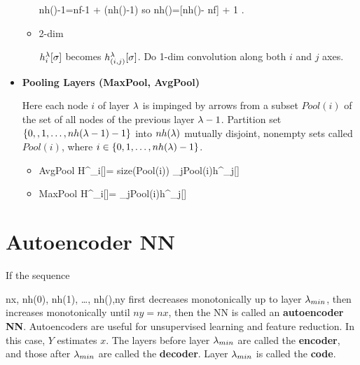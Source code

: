 \begin{itemize}
\begin{itemize}
\beq
nh()-1=nf-1 +
(nh(\lam)-1)\sigma
\;
\eeq
so
\beq
nh(\lam)=[nh()-
nf] + 1
\;.
\eeq
\item 2-dim

$h_i^\lambda[\sigma]$ becomes
$h_{(i,j)}^\lambda[\sigma]$.
Do 1-dim convolution
along both $i$ and $j$ axes.

\end{itemize}
\item{\bf Pooling Layers 
(MaxPool, AvgPool)}

Here each node $i$ 
of layer $\lambda$ is impinged by
arrows from  a subset $Pool(i)$
of the set of all
nodes of the previous layer $\lambda-1$.
Partition set
$\{0,,1,\dots,nh(\lambda-1)-1\}
$ into $nh(\lambda)$ mutually
disjoint, nonempty sets
called $Pool(i)$, where
$i\in \{0, 1, \ldots,nh(\lambda)-1\}$.

\begin{itemize}
\item AvgPool
\beq
H^\lam_i[\sigma]=
{size(Pool(i))}
\sum_{j\in Pool(i)}h^{}_j[\sigma]
\eeq
\item MaxPool
\beq
H^\lam_i[\sigma]=
\max_{j\in Pool(i)}h^{}_j[\sigma]
\eeq

\end{itemize}


\end{itemize}

\section*{Autoencoder NN}


If the sequence 

\beq
nx, nh(0), nh(1), \ldots,
nh(),ny
\eeq
first decreases monotonically 
up to layer $\lambda_{min}$, then
increases monotonically until
$ny=nx$, then
the NN is called an {\bf
autoencoder NN}.
Autoencoders
are  useful for unsupervised learning
and
feature reduction. In this case,
$Y$ estimates $x$.
The layers before
layer $\lambda_{min}$
are called the {\bf encoder},
and those after 
$\lambda_{min}$ are called the 
{\bf decoder}.
Layer $\lambda_{min}$
is called the {\bf code}.



